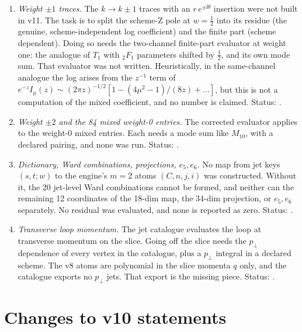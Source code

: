 \begin{enumerate}[label=(\alph*)]
\item \emph{Weight \(\pm1\) traces.} The \(k\to k\pm1\) traces with an
\(r\,e^{\pm\ii\theta}\) insertion were not built in v11. The task is
to split the scheme-Z pole at \(w=\tfrac12\) into its residue (the
genuine, scheme-independent log coefficient) and the finite part
(scheme dependent). Doing so needs the two-channel finite-part
evaluator at weight one: the analogue of \(T_1\) with
\({}_2F_1\) parameters shifted by \(\tfrac12\), and its own mode sum.
That evaluator was not written. Heuristically, in the same-channel
analogue the log arises from the \(z^{-1}\) term of
\(e^{-z}I_\mu(z)\sim(2\pi z)^{-1/2}[1-(4\mu^2-1)/(8z)+\dots]\), but
this is not a computation of the mixed coefficient, and no number is
claimed. Status: \OPEN.
\item \emph{Weight \(\pm2\) and the 84 mixed weight-0 entries.} The
corrected evaluator applies to the weight-0 mixed entries. Each
needs a mode sum like \(M_{10}\), with a declared pairing, and none
was run. Status: \OPEN.
\item \emph{Dictionary, Ward combinations, projections, \(e_5,e_6\).}
No map from jet keys \((s,t;w)\) to the engine's \(m=2\) atoms
\((C,n,j,i)\) was constructed. Without it, the 20 jet-level Ward
combinations cannot be formed, and neither can the remaining 12
coordinates of the 18-dim map, the 34-dim projection, or \(e_5,e_6\)
separately. No residual was evaluated, and none is reported as zero.
Status: \OPEN.
\item \emph{Transverse loop momentum.} The jet catalogue evaluates the
loop at transverse momentum on the slice. Going off the slice needs
the \(p_\perp\) dependence of every vertex in the catalogue, plus a
\(p_\perp\) integral in a declared scheme. The v8 atoms are
polynomial in the slice momenta \(q\) only, and the catalogue
exports no \(p_\perp\) jets. That export is the missing piece.
Status: \OPEN.
\end{enumerate}

\section{Changes to v10 statements}
\label{sec:v11changes}

